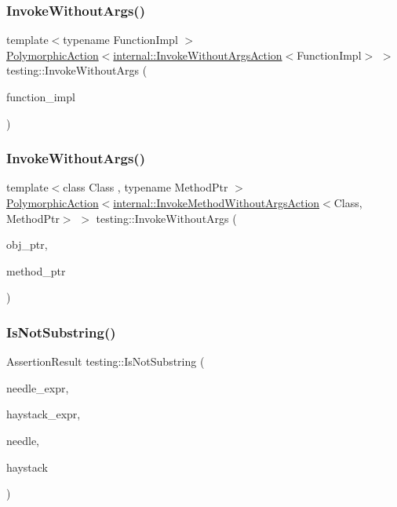 \subsubsection{\texorpdfstring{InvokeWithoutArgs()}{InvokeWithoutArgs()}\hspace{0.1cm}{\footnotesize\ttfamily [3/4]}}
{\footnotesize\ttfamily template$<$typename Function\+Impl $>$ \\
\mbox{\hyperlink{classtesting_1_1_polymorphic_action}{Polymorphic\+Action}}$<$\mbox{\hyperlink{structtesting_1_1internal_1_1_invoke_without_args_action}{internal\+::\+Invoke\+Without\+Args\+Action}}$<$Function\+Impl$>$ $>$ testing\+::\+Invoke\+Without\+Args (\begin{DoxyParamCaption}\item[{Function\+Impl}]{function\+\_\+impl }\end{DoxyParamCaption})}

\mbox{\label{namespacetesting_ab75325d71a8c37db94f349243815c728}} 
\subsubsection{\texorpdfstring{InvokeWithoutArgs()}{InvokeWithoutArgs()}\hspace{0.1cm}{\footnotesize\ttfamily [4/4]}}
{\footnotesize\ttfamily template$<$class Class , typename Method\+Ptr $>$ \\
\mbox{\hyperlink{classtesting_1_1_polymorphic_action}{Polymorphic\+Action}}$<$\mbox{\hyperlink{structtesting_1_1internal_1_1_invoke_method_without_args_action}{internal\+::\+Invoke\+Method\+Without\+Args\+Action}}$<$Class, Method\+Ptr$>$ $>$ testing\+::\+Invoke\+Without\+Args (\begin{DoxyParamCaption}\item[{Class $\ast$}]{obj\+\_\+ptr,  }\item[{Method\+Ptr}]{method\+\_\+ptr }\end{DoxyParamCaption})}

\mbox{\label{namespacetesting_a2288dcf4249f88af67dcd46544dc49a6}} 
\subsubsection{\texorpdfstring{IsNotSubstring()}{IsNotSubstring()}\hspace{0.1cm}{\footnotesize\ttfamily [1/3]}}
{\footnotesize\ttfamily Assertion\+Result testing\+::\+Is\+Not\+Substring (\begin{DoxyParamCaption}\item[{const char $\ast$}]{needle\+\_\+expr,  }\item[{const char $\ast$}]{haystack\+\_\+expr,  }\item[{const char $\ast$}]{needle,  }\item[{const char $\ast$}]{haystack }\end{DoxyParamCaption})}

